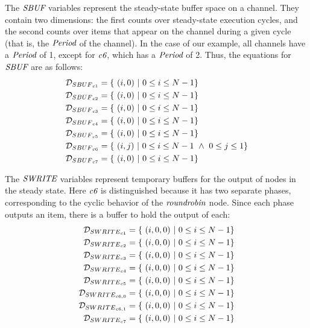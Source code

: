 The $\mbox{\it SBUF}$ variables represent the steady-state buffer space on a
channel.  They contain two dimensions: the first counts over
steady-state execution cycles, and the second counts over items that
appear on the channel during a given cycle (that is, the $\mbox{\it Period}$
of the channel).  In the case of our example, all channels have a
$\mbox{\it Period}$ of 1, except for $\mbox{\it c6}$, which has a $\mbox{\it Period}$
of 2.  Thus, the equations for $\mbox{\it SBUF}$ are as follows:
\begin{align*}
{\cal D}_{{SBUF}_{c1}} &= \{ ~(i,0)~|~0 \le i \le N - 1\} \\
{\cal D}_{{SBUF}_{c2}} &= \{ ~(i,0)~|~0 \le i \le N - 1 \} \\
{\cal D}_{{SBUF}_{c3}} &= \{ ~(i,0)~|~0 \le i \le N - 1 \} \\
{\cal D}_{{SBUF}_{c4}} &= \{ ~(i,0)~|~0 \le i \le N - 1 \} \\
{\cal D}_{{SBUF}_{c5}} &= \{ ~(i,0)~|~0 \le i \le N - 1 \} \\
{\cal D}_{{SBUF}_{c6}} &= \{ ~(i,j)~|~0 \le i \le N - 1 ~\wedge~ 0 \le j \le 1 \} \\
{\cal D}_{{SBUF}_{c7}} &= \{ ~(i,0)~|~0 \le i \le N - 1\}
\end{align*}


The $\mbox{\it SWRITE}$ variables represent temporary buffers for the output
of nodes in the steady state.  Here $\mbox{\it c6}$ is distinguished
because it has two separate phases, corresponding to the cyclic
behavior of the $\mbox{\it roundrobin}$ node.  Since each phase outputs an
item, there is a buffer to hold the output of each:
\begin{align*}
{\cal D}_{{SWRITE}_{c1}} &= \{~(i,0,0)~|~0 \le i \le N-1\} \\
{\cal D}_{{SWRITE}_{c2}} &= \{~(i,0,0)~|~0 \le i \le N-1 \} \\
{\cal D}_{{SWRITE}_{c3}} &= \{~(i,0,0)~|~0 \le i \le N-1 \} \\
{\cal D}_{{SWRITE}_{c4}} &= \{~(i,0,0)~|~0 \le i \le N-1 \} \\
{\cal D}_{{SWRITE}_{c5}} &= \{~(i,0,0)~|~0 \le i \le N-1 \} \\
{\cal D}_{{SWRITE}_{{c6}, 0}} &= \{~(i,0,0)~|~0 \le i \le N-1 \} \\
{\cal D}_{{SWRITE}_{{c6}, 1}} &= \{~(i,0,0)~|~0 \le i \le N-1 \} \\
{\cal D}_{{SWRITE}_{c7}} &= \{~(i,0,0)~|~0 \le i \le N-1\} 
\end{align*}

